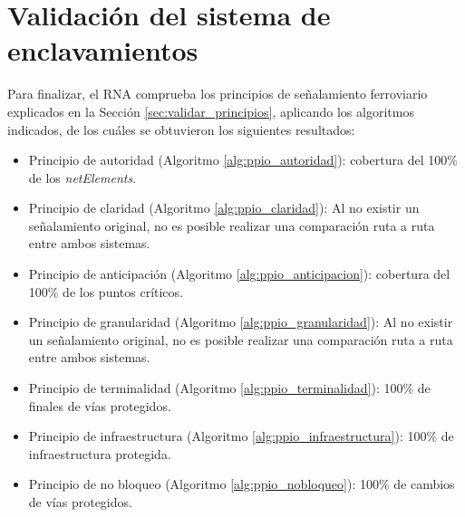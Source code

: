 \section{Validación del sistema de enclavamientos}

   	Para finalizar, el RNA comprueba los principios de señalamiento ferroviario explicados en la Sección \ref{sec:validar_principios}, aplicando los algoritmos indicados, de los cuáles se obtuvieron los siguientes resultados:
	
	\begin{itemize}
		\item Principio de autoridad (Algoritmo \ref{alg:ppio_autoridad}): cobertura del 100\% de los \textit{netElements}.
		\item Principio de claridad (Algoritmo \ref{alg:ppio_claridad}): Al no existir un señalamiento original, no es posible realizar una comparación ruta a ruta entre ambos sistemas.
		\item Principio de anticipación (Algoritmo \ref{alg:ppio_anticipacion}): cobertura del 100\% de los puntos críticos.
		\item Principio de granularidad (Algoritmo \ref{alg:ppio_granularidad}): Al no existir un señalamiento original, no es posible realizar una comparación ruta a ruta entre ambos sistemas.
		\item Principio de terminalidad (Algoritmo \ref{alg:ppio_terminalidad}): 100\% de finales de vías protegidos.
		\item Principio de infraestructura (Algoritmo \ref{alg:ppio_infraestructura}): 100\% de infraestructura protegida.
		\item Principio de no bloqueo (Algoritmo \ref{alg:ppio_nobloqueo}): 100\% de cambios de vías protegidos.
	\end{itemize}	
	
